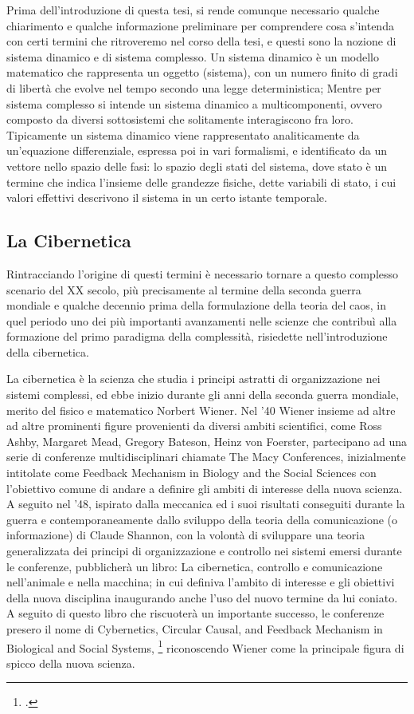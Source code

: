 Prima dell'introduzione di questa tesi, si rende comunque necessario
qualche chiarimento e qualche informazione 
preliminare per comprendere cosa s'intenda con certi termini che ritroveremo
nel corso della tesi, e questi sono la nozione di sistema dinamico e di sistema complesso.
Un sistema dinamico è un modello matematico che rappresenta un oggetto (sistema),
con un numero finito di gradi di libertà che evolve nel tempo secondo una legge
deterministica; Mentre per sistema complesso si intende un sistema dinamico a multicomponenti,
ovvero composto da diversi sottosistemi che solitamente interagiscono fra loro.
Tipicamente un sistema dinamico viene rappresentato analiticamente da un’equazione
differenziale, espressa poi in vari formalismi, e identificato da un vettore nello
spazio delle fasi: lo spazio degli stati del sistema, dove stato è un termine che
indica l’insieme delle grandezze fisiche, dette variabili di stato, i cui valori
effettivi descrivono il sistema in un certo istante temporale.

\subsection{La Cibernetica}
\label{sec:La Cibernetica}
Rintracciando l'origine di questi termini è necessario tornare 
a questo complesso scenario del XX secolo,
più precisamente al termine della seconda guerra mondiale e
qualche decennio prima della formulazione della teoria del caos,
in quel periodo uno dei più importanti avanzamenti nelle scienze che contribuì alla
formazione del primo paradigma della complessità,
risiedette nell'introduzione della cibernetica. 

La cibernetica è la scienza che studia i principi astratti di organizzazione
nei sistemi complessi, ed ebbe inizio durante gli anni della seconda guerra
mondiale, merito del fisico e matematico Norbert Wiener.
Nel '40 Wiener insieme ad altre ad altre prominenti figure provenienti
da diversi ambiti scientifici,
come Ross Ashby, Margaret Mead, Gregory Bateson, Heinz von Foerster,
partecipano ad una serie di conferenze
multidisciplinari chiamate The Macy Conferences, inizialmente intitolate come
Feedback Mechanism in Biology and the Social Sciences
con l'obiettivo comune di andare a definire
gli ambiti di interesse della nuova scienza.
A seguito nel '48,
ispirato dalla meccanica ed i suoi risultati conseguiti durante la guerra
e contemporaneamente dallo sviluppo della teoria della comunicazione
(o informazione) di Claude Shannon,
con la volontà di sviluppare una teoria generalizzata dei principi di
organizzazione e controllo nei sistemi emersi durante le conferenze,
pubblicherà un libro:
La cibernetica, controllo e comunicazione nell'animale e nella macchina;
in cui definiva l'ambito di interesse e gli obiettivi della nuova disciplina
inaugurando anche l'uso del nuovo termine da lui coniato.
A seguito di questo libro che riscuoterà
un importante successo, le conferenze presero il nome di
Cybernetics, Circular Causal, and Feedback Mechanism
in Biological and Social Systems, \footcite{fabbrisgiustinianocyb}
riconoscendo Wiener come la principale figura di spicco della nuova scienza. 

